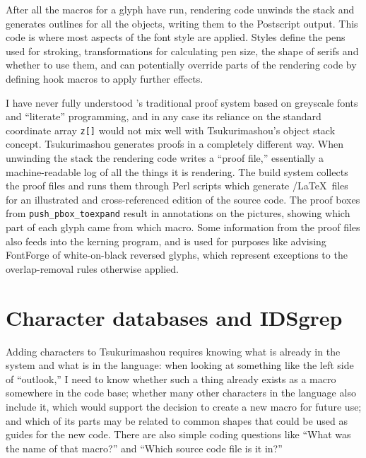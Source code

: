 \documentclass{ltugboat}
\begin{document}
After all the macros for a glyph have run, rendering code unwinds the stack
and generates outlines for all the objects, writing them to the Postscript
output.  This code is where most aspects of the font style are applied. 
Styles define the pens used for stroking, transformations for calculating
pen size, the shape of serifs and whether to use them, and can potentially
override parts of the rendering code by defining hook macros to apply
further effects.

I have never fully understood \MF's traditional proof system based on
greyscale fonts and ``literate'' programming, and in any case its reliance
on the standard coordinate array \verb|z[]| would not mix well with
Tsukurimashou's object stack concept.  Tsukurimashou generates proofs in a
completely different way.  When unwinding the stack the rendering code
writes a ``proof file,'' essentially a machine-readable log of all the
things it is rendering.  The build system collects the proof files and runs
them through Perl scripts which generate \TikZ/\LaTeX\ files for an
illustrated and cross-referenced edition of the source code.  The proof
boxes from \verb|push_pbox_toexpand| result in annotations on the pictures,
showing which part of each glyph came from which macro.  Some information
from the proof files also feeds into the kerning program, and is used for
purposes like advising FontForge of white-on-black reversed glyphs, which
represent exceptions to the overlap-removal rules otherwise
applied.


\section{Character databases and IDSgrep}

Adding characters to Tsukurimashou requires knowing what is already in the
system and what is in the language: when looking at something like the left
side of ``outlook,'' I need to know whether such a thing already exists as a
macro somewhere in the code base; whether many other characters in the
language also include it, which would support the decision to create a new
macro for future use; and which of its parts may be related to common shapes
that could be used as guides for the new code.  There are also simple coding
questions like ``What was the name of that macro?'' and ``Which source code
file is it in?''
\end{document}
